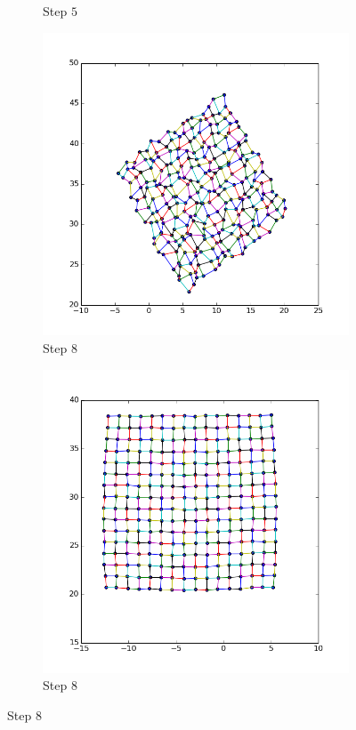 \documentclass[12pt,a4paper]{article}
\begin{document}
\begin{figure}
\begin{minipage}[0.2\textheight]{\textwidth}
\begin{subfigure}{0.5\textwidth}
            \caption{Step $5$}
     \end{subfigure}        
\end{minipage}
\begin{minipage}[0.2\textheight]{\textwidth}	%
	 \begin{subfigure}{0.5\textwidth}
		   \centering
           \includegraphics[scale=0.4]{results_Harel/rand1/HK_step8_eps1.png}
           \caption{Step $8$}
     \end{subfigure}
	 \begin{subfigure}{0.5\textwidth}
	 	    \centering
            \includegraphics[scale=0.4]{results_Harel/rand01/HK_step8_eps01.png}
            \caption{Step $8$}
     \end{subfigure}        
\end{minipage}


\end{figure}
\end{document}
